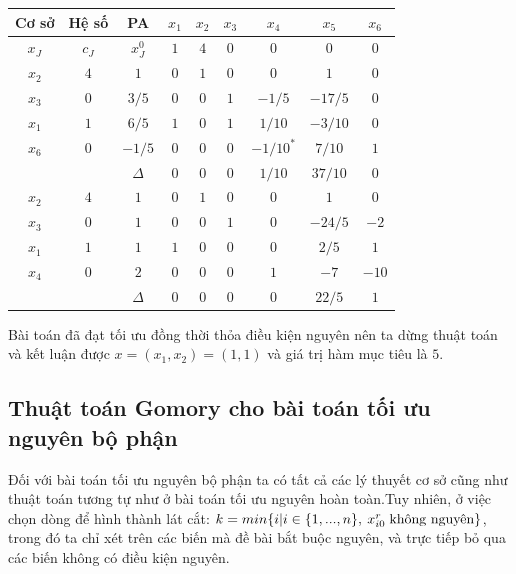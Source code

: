 \documentclass[12pt,a4paper]{report}
\begin{document}
     \begin{center}
         \begin{tabular}{|c|c|c|c|c|c|c|c|c|}
        \hline
         Cơ sở & Hệ số & PA& $x_1$ &$x_2$ &$ x_3$ &$x_4$ &$x_5$ &$x_6$\\
        \hline
        $x_J$ &$c_J$ &$x_J^0$ &$1$ &$4$ &$0$ &$0$ &$0$ &$0$\\
        \hline
        $x_2$ &$4$ &$1$ &$0$ &$1$ &$0$ &$0$ &$1$ &$0$\\
        $x_3$ &$0$ &$3/5$ &$0$ &$0$ &$1$ &$-1/5$ &$-17/5$ & $0$\\
        $x_1$ &$1$ &$6/5$ &$1$ &$0$ &$1$ &$1/10$&$-3/10$ &$0$\\
        $x_6$ &$0$ &$-1/5$ &$0$ &$0$ & $0$ &$-1/10^*$ &$7/10$ &$1$\\
        \hline
        && $\Delta$ &$0$ &$0$ &$0$ &$1/10$ &$37/10$ &$0$\\
        \hline
        $x_2$ &$4$ &$1$ &$0$ &$1$ &$0$ &$0$ &$1$ &$0$\\
        $x_3$ &$0$ &$1$ &$0$ &$0$ &$1$ &$0$ &$-24/5$ &$-2$\\
        $x_1$ &$1$ &$1$ &$1$ &$0$ &$0$ &$0$ &$2/5$ &$1$\\
        $x_4$ &$0$ &$2$ &$0$ &$0$ &$0$ &$1$ &$-7$ &$-10$\\
        \hline
        && $\Delta$ &$0$ &$0$ &$0$ &$0$&$ 22/5$ &$1$\\
        \hline
        
         \end{tabular}
     \end{center}
     Bài toán đã đạt tối ưu đồng thời thỏa điều kiện nguyên nên ta dừng thuật toán và kết luận được $x=(x_1,x_2)=(1,1)$ và giá trị hàm mục tiêu là $5$.
\subsection{Thuật toán Gomory cho bài toán tối ưu nguyên bộ phận}
 Đối với bài toán tối ưu nguyên bộ phận ta có tất cả các lý thuyết cơ sở cũng như thuật toán tương tự như ở bài toán tối ưu nguyên hoàn toàn.Tuy nhiên, ở việc chọn dòng để hình thành lát cắt:
 $k=min\{i|i\in \{1,...,n\}, \: x_{i0}^r \hspace{0.1cm} \text{không nguyên}\}$, trong đó ta chỉ xét trên các biến mà đề bài bắt buộc nguyên, và trực tiếp bỏ qua các biến không có điều kiện nguyên.
\end{document}
